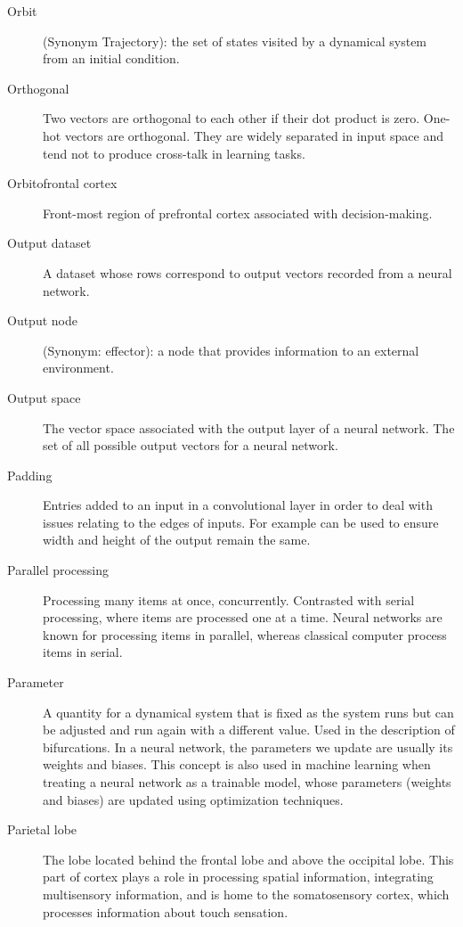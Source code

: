 \begin{description}
\item[Orbit] (Synonym Trajectory): the set of states visited by a dynamical system from an initial condition. 

\item[Orthogonal] Two vectors are orthogonal to each other if their dot product is zero. One-hot vectors are orthogonal. They are widely separated in input space and tend not to produce cross-talk in learning tasks.

\item[Orbitofrontal cortex] Front-most region of prefrontal cortex associated with decision-making.

\item[Output dataset] A dataset whose rows correspond to output vectors recorded from a neural network. 

\item[Output node] (Synonym: effector): a node that provides information to an external environment. 

\item[Output space] The vector space associated with the output layer of a neural network. The set of all possible output vectors for a neural network.

\item[Padding] Entries added to an input in a convolutional layer in order to deal with issues relating to the edges of inputs. For example can be used to ensure width and height of the output remain the same.

\item[Parallel processing] Processing many items at once, concurrently. Contrasted with serial processing, where items are processed one at a time.  Neural networks are known for processing items in parallel, whereas classical computer process items in serial.

\item[Parameter] A quantity for a dynamical system that is fixed as the system runs but can be adjusted and run again with a different value. Used in the description of bifurcations. In a neural network, the parameters we  update are usually its weights and biases. This concept is also used in machine learning when treating a neural network as a trainable model, whose parameters (weights and biases) are updated using optimization techniques.

\item[Parietal lobe] The lobe located behind the frontal lobe and above the occipital lobe. This part of cortex plays a role in processing spatial information, integrating multisensory information, and is home to the somatosensory cortex, which processes information about touch sensation.


\end{description}
